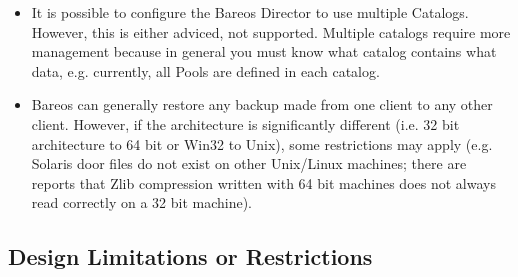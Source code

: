 \begin{itemize}
\item \label{MultipleCatalogs} It is possible to configure the Bareos Director to use multiple Catalogs.
   However, this is either adviced, not supported.
   Multiple catalogs require more management because in general
   you must know what catalog contains what data, e.g. currently, all Pools are defined in each catalog.
\item Bareos can generally restore any backup made from one client
   to any other client. However, if the architecture is significantly
   different (i.e. 32 bit architecture to 64 bit or Win32 to Unix),
   some restrictions may apply (e.g. Solaris door files do not exist
   on other Unix/Linux machines; there are reports that Zlib compression
   written with 64 bit machines does not always read correctly on a 32 bit
   machine).
\end{itemize}

\subsection{Design Limitations or Restrictions}
\label{sec:DesignLimitations}


